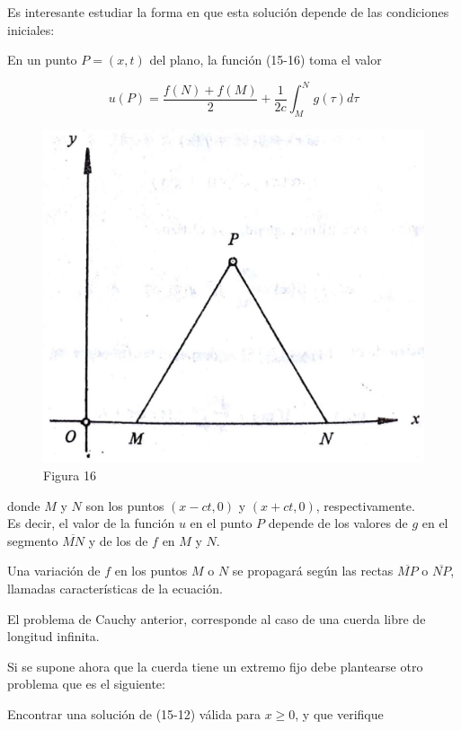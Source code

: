 \documentclass[10pt]{article}
\theoremstyle{plain}
\theoremstyle{definition}
\theoremstyle{remark}
\begin{document}
Es interesante estudiar la forma en que esta solución depende de las condiciones iniciales:

En un punto $P=(x, t)$ del plano, la función (15-16) toma el valor

$$
u(P)=\frac{f(N)+f(M)}{2}+\frac{1}{2 c} \int_{M}^{N} g(\tau) d \tau
$$

\begin{figure}[h]
\begin{center}
  \includegraphics[width=\textwidth]{2025_09_05_adecef5eb2053bc129b5g-357}
\captionsetup{labelformat=empty}
\caption{Figura 16}
\end{center}
\end{figure}

donde $M$ y $N$ son los puntos $(x-c t, 0)$ y $(x+c t, 0)$, respectivamente.\\
Es decir, el valor de la función $u$ en el punto $P$ depende de los valores de $g$ en el segmento $\overline{M N}$ y de los de $f$ en $M$ y $N$.

Una variación de $f$ en los puntos $M$ o $N$ se propagará según las rectas $\overline{M P}$ o $\overline{N P}$, llamadas características de la ecuación.

El problema de Cauchy anterior, corresponde al caso de una cuerda libre de longitud infinita.

Si se supone ahora que la cuerda tiene un extremo fijo debe plantearse otro problema que es el siguiente:

Encontrar una solución de (15-12) válida para $x \geqslant 0$, y que verifique
\end{document}
